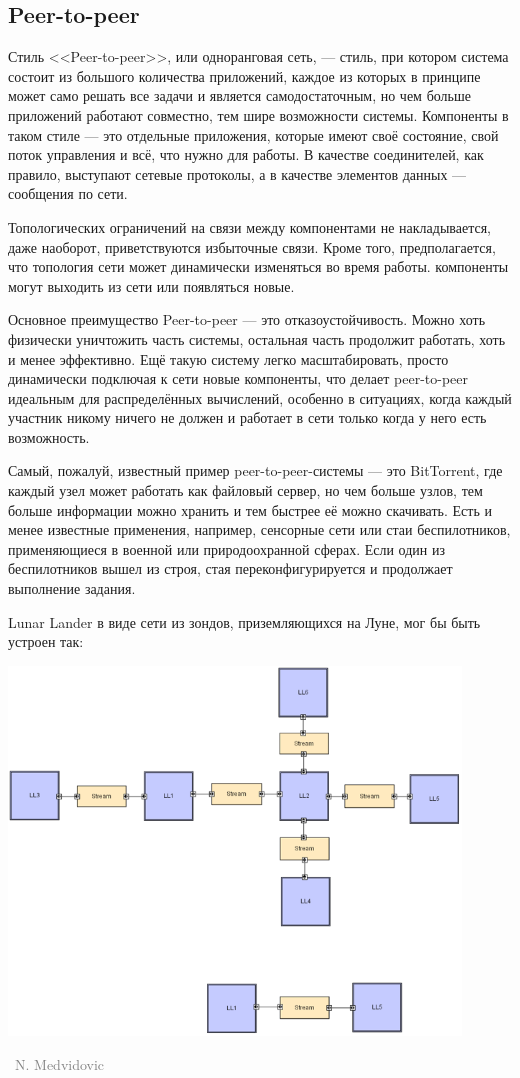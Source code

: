 \documentclass[a5paper]{article}
\newcommand{\attribution}[1] {
    \vspace{-4mm}\begin{flushright}\begin{scriptsize}\textcolor{gray}
    {\textcopyright\, #1}\end{scriptsize}\end{flushright}
}
\begin{document}
\subsection{Peer-to-peer}

Стиль <<Peer-to-peer>>, или одноранговая сеть, --- стиль, при котором система состоит из большого количества приложений, каждое из которых в принципе может само решать все задачи и является самодостаточным, но чем больше приложений работают совместно, тем шире возможности системы. Компоненты в таком стиле --- это отдельные приложения, которые имеют своё состояние, свой поток управления и всё, что нужно для работы. В качестве соединителей, как правило, выступают сетевые протоколы, а в качестве элементов данных --- сообщения по сети. 

Топологических ограничений на связи между компонентами не накладывается, даже наоборот, приветствуются избыточные связи. Кроме того, предполагается, что топология сети может динамически изменяться во время работы. компоненты могут выходить из сети или появляться новые.

Основное преимущество Peer-to-peer --- это отказоустойчивость. Можно хоть физически уничтожить часть системы, остальная часть продолжит работать, хоть и менее эффективно. Ещё такую систему легко масштабировать, просто динамически подключая к сети новые компоненты, что делает peer-to-peer идеальным для распределённых вычислений, особенно в ситуациях, когда каждый участник никому ничего не должен и работает в сети только когда у него есть возможность.

Самый, пожалуй, известный пример peer-to-peer-системы --- это BitTorrent, где каждый узел может работать как файловый сервер, но чем больше узлов, тем больше информации можно хранить и тем быстрее её можно скачивать. Есть и менее известные применения, например, сенсорные сети или стаи беспилотников, применяющиеся в военной или природоохранной сферах. Если один из беспилотников вышел из строя, стая переконфигурируется и продолжает выполнение задания.

Lunar Lander в виде сети из зондов, приземляющихся на Луне, мог бы быть устроен так:

\begin{center}
    \includegraphics[width=0.9\textwidth]{peerToPeerLL.png}
    \attribution{N. Medvidovic}
\end{center}
\end{document}
